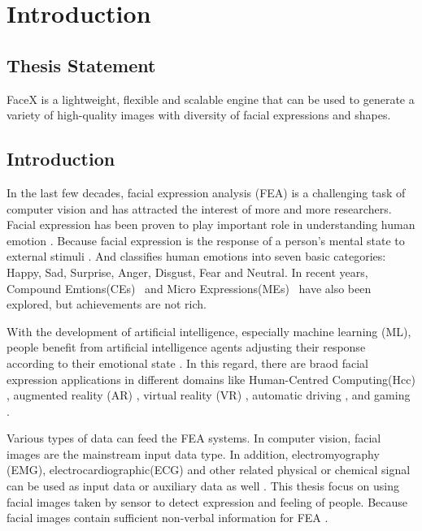 \chapter{Introduction}
\label{cha:intro}


\section{Thesis Statement}
\label{sec:thesisstatement}
FaceX is a lightweight, flexible and scalable engine that can be used to generate a variety of high-quality images with diversity of facial expressions and shapes. 


\section{Introduction}
\label{sec:problemstatement}

In the last few decades, facial expression analysis (FEA) is a challenging task of computer vision and has attracted the interest of more and more researchers. Facial expression has been proven to play important role in understanding human emotion \citep{Mehrabian_Russell_1974}. Because facial expression is the response of a person's mental state to external stimuli \citep{Cabanac_2002}. And \citeauthor{ekmanArgumentBasicEmotions1992} classifies human emotions into seven basic categories: Happy, Sad, Surprise, Anger, Disgust, Fear and Neutral. In recent years, Compound Emtions(CEs)~\citep{duCompoundFacialExpressions2014} and Micro Expressions(MEs)~\citep{ekmanDarwinDeceptionFacial2006} have also been explored, but achievements are not rich.

With the development of artificial intelligence, especially machine learning (ML), people benefit from artificial intelligence agents adjusting their response according to their emotional state \citep{adolphsInvestigatingEmotionsFunctional2018}. In this regard, 
there are braod facial expression applications in different domains like Human-Centred Computing(Hcc) \citep{cowieEmotionRecognitionHumancomputer2001}, augmented reality (AR) \citep{chenAugmentedRealitybasedSelffacial2015}, virtual reality (VR) \citep{bekeleUnderstandingHowAdolescents2013}, automatic driving \citep{jabonFacialExpressionAnalysis2011}, and gaming \citep{lankesFacialExpressionsGame2008}. 

Various types of data can feed the FEA systems. In computer vision, facial images are the mainstream input data type. In addition, electromyography (EMG), electrocardiographic(ECG) and other related physical or chemical signal can be used as input data or auxiliary data as well \citep{jerrittaPhysiologicalSignalsBased2011}. This thesis focus on using facial images taken by sensor to detect expression and feeling of people. Because facial images contain sufficient non-verbal information for FEA \citep{huangFacialExpressionRecognition2019}. 

